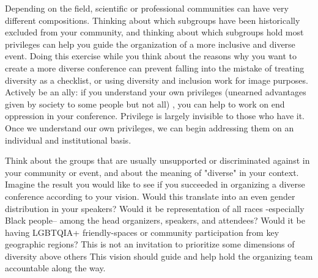 \documentclass[10pt,letterpaper]{article}
\begin{document}
Depending on the field, scientific or professional communities can have very different compositions. Thinking about which subgroups have been historically excluded from your community, and thinking about which subgroups hold most privileges can help you guide the organization of a more inclusive and diverse event. Doing this exercise while you think about the reasons why you want to create a more diverse conference can prevent falling into the mistake of treating diversity as a checklist, or using diversity and inclusion work for image purposes.
Actively be an ally: if you understand your own privileges (unearned advantages given by society to some people but not all) \cite{}, you can help to work on end oppression in your conference. Privilege is largely invisible to those who have it. Once we understand our own privileges, we can begin addressing them on an individual and institutional basis.

Think about the groups that are usually unsupported or discriminated against in your community or event, and about the meaning of "diverse" in your context. Imagine the result you would like to see if you succeeded in organizing a diverse conference according to your vision. Would this translate into an even gender distribution in your speakers? Would it be representation of all races -especially Black people-- among the head organizers, speakers, and attendees? Would it be having LGBTQIA+ friendly-spaces or community participation from key geographic regions? This is not an invitation to prioritize some dimensions of diversity above others This vision should guide and help hold the organizing team accountable along the way.
\end{document}
